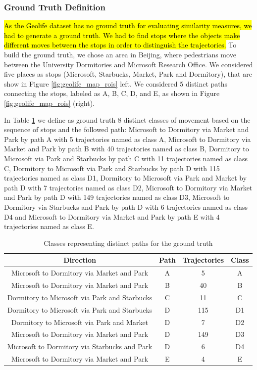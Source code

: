 \documentclass[12pt]{article}
\begin{document}
\subsubsection{Ground Truth Definition}
\hl{As the Geolife dataset has no ground truth for evaluating similarity measures, we had to generate a ground truth. We had to find stops where the objects make different moves between the stops in order to distinguish the trajectories.}
To build the ground truth, we chose an area in Beijing, where pedestrians move between the University Dormitories and Microsoft Research Office. We considered five places as stops (Microsoft, Starbucks, Market, Park and Dormitory), that are show in Figure \ref{fig:geolife_map_rois} left. We considered 5 distinct paths connecting the stops, labeled as A, B, C, D, and E, as shown in Figure \ref{fig:geolife_map_rois} (right).

In Table \ref{tab:geolife_dataset} we define as ground truth 8 distinct classes of movement based on the sequence of stops and the followed path: Microsoft to Dormitory via Market and Park by path A with 5 trajectories named as class A, Microsoft to Dormitory via Market and Park by path B with 40 trajectories named as class B, Dormitory to Microsoft via Park and Starbucks by path C with 11 trajectories named as class C, Dormitory to Microsoft via Park and Starbucks by path D with 115 trajectories named as class D1, Dormitory to Microsoft via Park and Market by path D with 7 trajectories named as class D2, Microsoft to Dormitory via Market and Park by path D with 149 trajectories named as class D3, Microsoft to Dormitory via Starbucks and Park by path D with 6 trajectories named as class D4 and Microsoft to Dormitory via Market and Park by path E with 4 trajectories named as class E.

\begin{table}[ht!]
\scriptsize
  \centering
  \begin{tabular}{|c|c|c|c|}
  	\hline
 Direction & Path &  Trajectories & Class \\
  	\hline
Microsoft to Dormitory via Market and Park& A & 5 & A \\
Microsoft to Dormitory via Market and Park& B & 40&B \\
Dormitory to Microsoft via Park and Starbucks& C & 11&C \\
Dormitory to Microsoft via Park and Starbucks& D & 115&D1 \\
Dormitory to Microsoft via Park and Market& D & 7&D2 \\
Microsoft to Dormitory via Market and Park& D & 149&D3 \\
Microsoft to Dormitory via Starbucks and Park& D & 6&D4 \\
Microsoft to Dormitory via Market and Park& E & 4& E \\
    \hline
  \end{tabular}
  \caption{Classes representing distinct paths for the ground truth}
  \label{tab:geolife_dataset}
\end{table}
\end{document}
